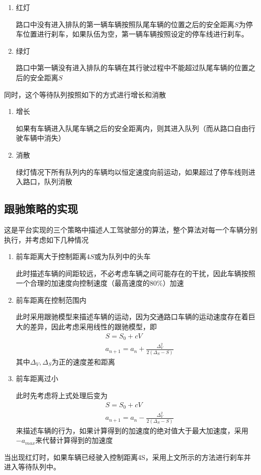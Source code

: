 \documentclass[UTF8,a4paper]{ctexart}
\begin{document}
\begin{enumerate}
\item 红灯

路口中没有进入排队的第一辆车辆按照队尾车辆的位置之后的安全距离$S$为停车位置进行刹车，如果队伍为空，第一辆车辆按照设定的停车线进行刹车。

\item 绿灯

路口中第一辆没有进入排队的车辆在其行驶过程中不能超过队尾车辆的位置之后的安全距离$S$
\end{enumerate}
同时，这个等待队列按照如下的方式进行增长和消散
\begin{enumerate}
\item 增长

如果有车辆进入队尾车辆之后的安全距离内，则其进入队列（而从路口自由行驶车辆中消失）

\item 消散

绿灯情况下所有队列内的车辆均以恒定速度向前运动，如果超过了停车线则进入路口，队列消散
\end{enumerate}
\subsection{跟驰策略的实现}
这是平台实现的三个策略中描述人工驾驶部分的算法，整个算法对每一个车辆分别执行，并考虑如下几种情况
\begin{enumerate}
\item 前车距离大于控制距离$4S$或为队列中的头车

此时描述车辆的间距较远，不必考虑车辆之间可能存在的干扰，因此车辆按照一个合理的加速度向控制速度（最高速度的80\%）加速

\item 前车距离在控制范围内

此时采用跟驰模型来描述车辆的运动，因为交通路口车辆的运动速度存在着巨大的差异，因此考虑采用线性的跟驰模型，即
\begin{equation}
\begin{aligned}
& S=S_0+cV \\
& a_{n+1}=a_n+\frac{\Delta^2_V}{2(\Delta_S-S)}
\end{aligned}
\end{equation}
其中$\Delta_V,\Delta_S$为正的速度差和距离

\item 前车距离过小

此时先考虑将上式处理后变为
\begin{equation}
\begin{aligned}
& S=S_0+cV \\
& a_{n+1}=a_n-\frac{\Delta^2_V}{2(\Delta_S-S)}
\end{aligned}
\end{equation}
来描述车辆的行为，如果计算得到的加速度的绝对值大于最大加速度，采用$-a_{max}$来代替计算得到的加速度
\end{enumerate}
当出现红灯时，如果车辆已经驶入控制距离4S，采用上文所示的方法进行刹车并进入等待队列中。
\end{document}
